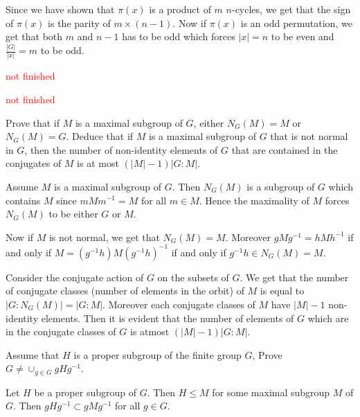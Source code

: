 \documentclass[12pt]{exam}
\theoremstyle{plain} %
\theoremstyle{definition} %
\theoremstyle{remark} %
\begin{document}
\begin{questions}
\begin{solution}
    Since we have shown that $\pi(x)$ is a product of $m$ $n$-cycles,
    we get that the sign of $\pi(x)$ is the parity of $m \times (n-1)$.
    Now if $\pi(x)$ is an odd permutation, we get that both $m$ and
    $n-1$ has to be odd which forces $|x| = n$ to be even and
    $\frac{|G|}{|x|} = m$ to be odd.

  \end{solution}

  \question
  \textcolor{red}{not finished}

  \begin{solution}

  \end{solution}

  \question
  \textcolor{red}{not finished}

  \begin{solution}

  \end{solution}

  \question
  Prove that if $M$ is a maximal subgroup of $G$, either $N_G(M) = M$
  or $N_G(M) = G$. Deduce that if $M$ is a maximal subgroup of $G$
  that is not normal in $G$, then the number of non-identity elements
  of $G$ that are contained in the conjugates of $M$ is at most $(|M|
  - 1)|G:M|$.
  \begin{solution}
    Assume $M$ is a maximal subgroup of $G$. Then $N_G(M)$ is a
    subgroup of $G$ which contains $M$ since $mMm^{-1} = M$ for all
    $m \in M$. Hence the maximality of $M$ forces $N_G(M)$ to be
    either $G$ or $M$.

    Now if $M$ is not normal, we get that $N_G(M) = M$. Moreover
    $gMg^{-1} = hMh^{-1}$ if and only if $M =
    (g^{-1}h)M(g^{-1}h)^{-1}$ if and only if $g^{-1}h \in N_G(M) = M$.

    Consider the conjugate action of $G$ on the subsets of $G$. We
    get that the number of conjugate classes (number of elements in
    the orbit) of $M$ is equal to $|G:N_G(M)| = |G:M|$. Moreover each
    conjugate classes of $M$ have $|M|-1$ non-identity elements. Then
    it is evident that the number of elements of $G$ which are in the
    conjugate classes of $G$ is atmost $(|M|-{1})|G:M|$.
  \end{solution}

  \question
  Assume that $H$ is a proper subgroup of the finite group $G$, Prove
  $G \neq \cup_{g \in G}gHg^{-1}$.
  \begin{solution}
    Let $H$ be a proper subgroup of $G$. Then $H \leqslant M$ for
    some maximal subgroup $M$ of $G$.
    Then $gHg^{-1} \subset gMg^{-1}$ for all $g \in G$.


\end{solution}
\end{questions}
\end{document}
